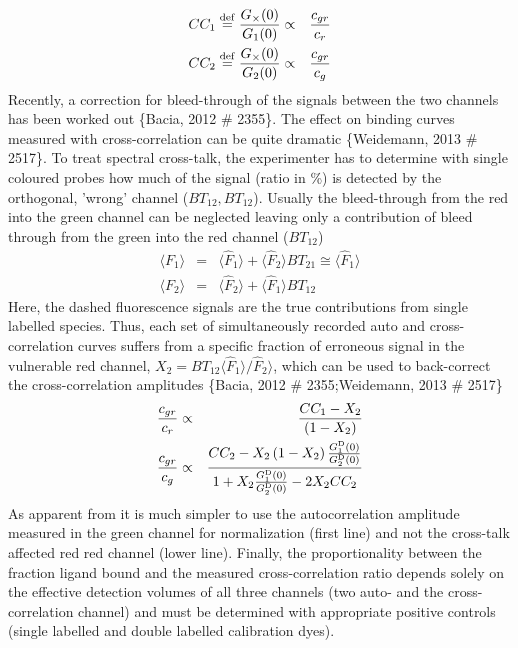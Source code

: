 	\begin{eqnarray}
	\label{eq21}
	CC_1 \stackrel{\rm def}{=} \frac{G_\times(0)}{G_1(0)} & \propto & \frac{c_{gr}}{c_r} \nonumber \\ CC_2 \stackrel{\rm def}{=} \frac{G_\times(0)}{G_2(0)} &\propto & \frac{c_{gr}}{c_g}
	\end{eqnarray}
Recently, a correction for bleed-through of the signals between the two channels has been worked out \{Bacia, 2012 \# 2355\}. The effect on binding curves measured with cross-correlation can be quite dramatic \{Weidemann, 2013 \# 2517\}. To treat spectral cross-talk, the experimenter has to determine with single coloured probes how much of the signal (ratio in \%) is detected by the orthogonal, 'wrong' channel ($BT_{12}, BT_{12}$). Usually the bleed-through from the red into the green channel can be neglected leaving only a contribution of bleed through from the green into the red channel ($BT_{12}$)
	\begin{eqnarray}
	\label{eq22}
	\langle F_1 \rangle & = & \langle \hat{F}_1 \rangle + \langle \hat{F}_2 \rangle BT_{21} \cong  \langle \hat{F}_1 \rangle \nonumber \\ \langle F_2 \rangle & = & \langle \hat{F}_2 \rangle + \langle \hat{F}_1 \rangle BT_{12}
	\end{eqnarray}
Here, the dashed fluorescence signals are the true contributions from single labelled species. Thus, each set of simultaneously recorded auto and cross-correlation curves suffers from a specific fraction of erroneous signal in the vulnerable red channel, $X_2 = BT_{12} \langle \hat{F}_1 \rangle/\hat{F}_2 \rangle$, which can be used to back-correct the cross-correlation amplitudes  \{Bacia, 2012 \# 2355;Weidemann, 2013 \# 2517\}
	\begin{eqnarray}
	\label{eq23}
	\frac{c_{gr}}{c_r} & \propto & \frac{CC_1-X_2}{\left( 1-X_2 \right)} \nonumber \\ \frac{c_{gr}}{c_g} & \propto & \frac{CC_2-X_2 \left( 1-X_2 \right) \frac{G_1^{\rm D}(0)}{G_2^{\rm D}(0)}}{1+ X_2 \frac{G_1^{\rm D}(0)}{G_2^{\rm D}(0)} - 2 X_2 CC_2}
	\end{eqnarray}
As apparent from  it is much simpler to use the autocorrelation amplitude measured in the green channel for normalization (first line) and not the cross-talk affected red red channel (lower line). Finally, the proportionality between the fraction ligand bound and the measured cross-correlation ratio depends solely on the effective detection volumes of all three channels (two auto- and the cross-correlation channel) and must be determined with appropriate positive controls (single labelled and double labelled calibration dyes).

